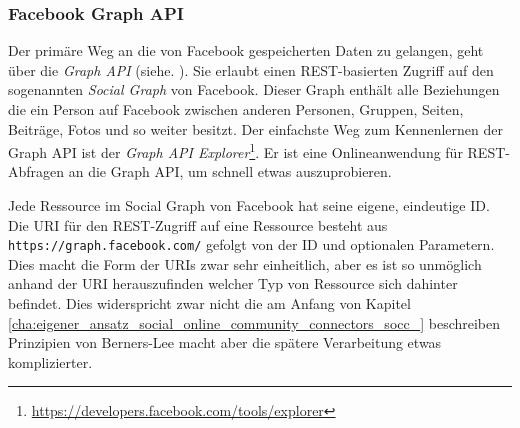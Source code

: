 
\subsubsection{Facebook Graph API} %
\label{ssub:facebook_graph_api}

Der primäre Weg an die von Facebook gespeicherten Daten zu gelangen, geht über die \emph{Graph API} (siehe. \cite{FacebookGraphAPI}). Sie erlaubt einen REST-basierten Zugriff auf den sogenannten \emph{Social Graph} von Facebook. Dieser Graph enthält alle Beziehungen die ein Person auf Facebook zwischen anderen Personen, Gruppen, Seiten, Beiträge, Fotos und so weiter besitzt. Der einfachste Weg zum Kennenlernen der Graph API ist der \emph{Graph API Explorer}\footnote{\url{https://developers.facebook.com/tools/explorer}}. Er ist eine Onlineanwendung für REST-Abfragen an die Graph API, um schnell etwas auszuprobieren.

Jede Ressource im Social Graph von Facebook hat seine eigene, eindeutige ID. Die URI für den REST-Zugriff auf eine Ressource besteht aus \texttt{https://graph.facebook.com/} gefolgt von der ID und optionalen Parametern. Dies macht die Form der URIs zwar sehr einheitlich, aber es ist so unmöglich anhand der URI herauszufinden welcher Typ von Ressource sich dahinter befindet. Dies widerspricht zwar nicht die am Anfang von Kapitel \ref{cha:eigener_ansatz_social_online_community_connectors_socc_} beschreiben Prinzipien von Berners-Lee macht aber die spätere Verarbeitung etwas komplizierter. 

